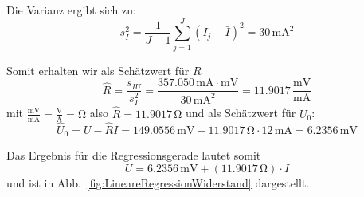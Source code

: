 Die Varianz ergibt sich zu: 
\[
s_I^2 = \frac{1}{J - 1}\sum\limits_{j = 1}^J {(I_j - \bar {I})^2} = 30  \, \mathrm{mA}^2
\]

Somit erhalten wir als Schätzwert für $R$
\[
\hat{R} = \frac{s_{IU} }{s_I^2} = \frac{357.050 \, \mathrm{mA} \cdot \mathrm{mV}}{30 \, \mathrm{mA}^2} = 11.9017 
\, \frac{\mathrm{mV}}{\mathrm{mA}}
\]
mit $\frac{\mathrm{mV}}{\mathrm{mA}} = \frac{\mathrm{V}}{\mathrm{A}} = \mathrm{\Omega}$ also $\hat{R} = 11.9017 \, \mathrm{\Omega}$
und als Schätzwert für $U_0$: 
\[
\hat{U}_0 = \bar {U} - \hat{R} \bar {I} = 149.0556 \, \mathrm{mV}-  11.9017  \, \mathrm{\Omega} \cdot 12 \, \mathrm{mA} =
6.2356 \, \mathrm{mV}
\]

Das Ergebnis für die Regressionsgerade lautet somit
\begin{equation}
U = 6.2356  \, \mathrm{mV} + (11.9017 \, \mathrm{\Omega}) \cdot I 
\end{equation}
 und ist in Abb.~\ref*{fig:LineareRegressionWiderstand} dargestellt.

